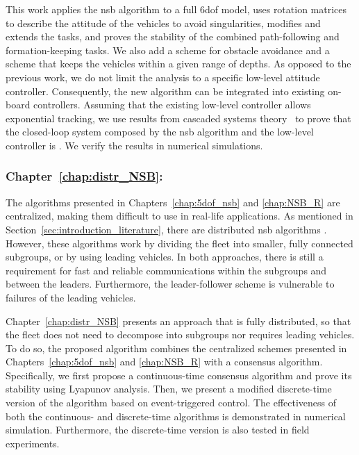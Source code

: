 This work applies the \gls{nsb} algorithm to a full 6\gls{dof} model, uses rotation matrices to describe the attitude of the vehicles to avoid singularities, modifies and extends the tasks, and proves the stability of the combined path-following and formation-keeping tasks.
We also add a scheme for obstacle avoidance and a scheme that keeps the vehicles within a given range of depths.
As opposed to the previous work, we do not limit the analysis to a specific low-level attitude controller.
Consequently, the new algorithm can be integrated into existing on-board controllers.
Assuming that the existing low-level controller allows exponential tracking, we use results from cascaded systems theory~\cite{pettersen_lyapunov_2017} to prove that the closed-loop system composed by the \gls{nsb} algorithm and the low-level controller is .
We verify the results in numerical simulations.

\subsubsection{Chapter~\ref{chap:distr_NSB}: }

The algorithms presented in Chapters~\ref{chap:5dof_nsb} and \ref{chap:NSB_R} are centralized, making them difficult to use in real-life applications.
As mentioned in Section~\ref{sec:introduction_literature}, there are distributed \gls{nsb} algorithms \cite{ahmad_multirobot_2014,tan_coordinated_2022}.
However, these algorithms work by dividing the fleet into smaller, fully connected subgroups, or by using leading vehicles.
In both approaches, there is still a requirement for fast and reliable communications within the subgroups and between the leaders.
Furthermore, the leader-follower scheme is vulnerable to failures of the leading vehicles.

Chapter~\ref{chap:distr_NSB} presents an approach that is fully distributed, so that the fleet does not need to decompose into subgroups nor requires leading vehicles.
To do so, the proposed algorithm combines the centralized schemes presented in Chapters~\ref{chap:5dof_nsb} and \ref{chap:NSB_R} with a consensus algorithm.
Specifically, we first propose a continuous-time consensus algorithm and prove its stability using Lyapunov analysis.
Then, we present a modified discrete-time version of the algorithm based on event-triggered control.
The effectiveness of both the continuous- and discrete-time algorithms is demonstrated in numerical simulation.
Furthermore, the discrete-time version is also tested in field experiments.

